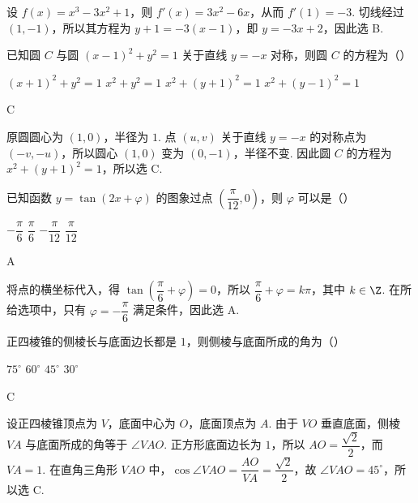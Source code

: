 \begin{solution}
设 \(f(x)=x^3-3x^2+1\)，则 \(f'(x)=3x^2-6x\)，从而 \(f'(1)=-3\). 切线经过 \((1,-1)\)，所以其方程为 \(y+1=-3(x-1)\)，即 \(y=-3x+2\)，因此选 B.
\end{solution}

\begin{problem}
已知圆 \(C\) 与圆 \((x-1)^2+y^2=1\) 关于直线 \(y=-x\) 对称，则圆 \(C\) 的方程为（\quad）

\choices
    {\((x+1)^2+y^2=1\)}
    {\(x^2+y^2=1\)}
    {\(x^2+(y+1)^2=1\)}
    {\(x^2+(y-1)^2=1\)}
\end{problem}

\begin{answer}
C
\end{answer}

\begin{solution}
原圆圆心为 \((1,0)\)，半径为 \(1\). 点 \((u,v)\) 关于直线 \(y=-x\) 的对称点为 \((-v,-u)\)，所以圆心 \((1,0)\) 变为 \((0,-1)\)，半径不变. 因此圆 \(C\) 的方程为 \(x^2+(y+1)^2=1\)，所以选 C.
\end{solution}

\begin{problem}
已知函数 \(y=\tan(2x+\varphi)\) 的图象过点 \(\left(\dfrac{\pi}{12},0\right)\)，则 \(\varphi\) 可以是（\quad）

\choices
    {\(-\dfrac{\pi}{6}\)}
    {\(\dfrac{\pi}{6}\)}
    {\(-\dfrac{\pi}{12}\)}
    {\(\dfrac{\pi}{12}\)}
\end{problem}

\begin{answer}
A
\end{answer}

\begin{solution}
将点的横坐标代入，得 \(\tan\left(\dfrac{\pi}{6}+\varphi\right)=0\)，所以 \(\dfrac{\pi}{6}+\varphi=k\pi\)，其中 \(k\in\Z\). 在所给选项中，只有 \(\varphi=-\dfrac{\pi}{6}\) 满足条件，因此选 A.
\end{solution}

\begin{problem}
正四棱锥的侧棱长与底面边长都是 \(1\)，则侧棱与底面所成的角为（\quad）

\choices
    {\(75^{\circ}\)}
    {\(60^{\circ}\)}
    {\(45^{\circ}\)}
    {\(30^{\circ}\)}
\end{problem}

\begin{answer}
C
\end{answer}

\begin{solution}
设正四棱锥顶点为 \(V\)，底面中心为 \(O\)，底面顶点为 \(A\). 由于 \(VO\) 垂直底面，侧棱 \(VA\) 与底面所成的角等于 \(\angle VAO\). 正方形底面边长为 \(1\)，所以 \(AO=\dfrac{\sqrt2}{2}\)，而 \(VA=1\). 在直角三角形 \(VAO\) 中，\(\cos\angle VAO=\dfrac{AO}{VA}=\dfrac{\sqrt2}{2}\)，故 \(\angle VAO=45^{\circ}\)，所以选 C.
\end{solution}

